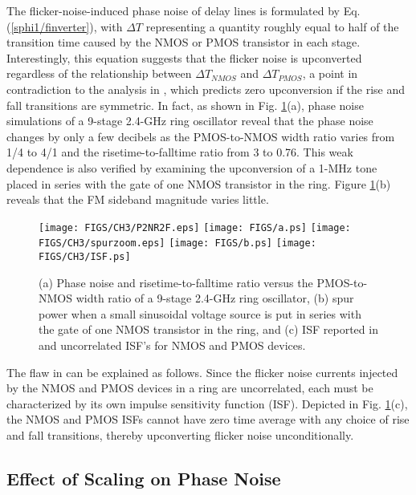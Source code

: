 The flicker-noise-induced phase noise of delay lines is formulated by Eq. (\ref{sphi1/finverter}), with $\Delta T$ representing a quantity roughly equal to half of the transition time
caused by the NMOS or PMOS transistor in each stage. Interestingly, this equation suggests that the flicker noise is upconverted regardless of the relationship between $\Delta
T_{NMOS}$ and $\Delta T_{PMOS}$, a point in contradiction to the analysis in \cite{Hajimiri}, which predicts zero upconversion if the rise and fall transitions are symmetric. In fact,
as shown in Fig. \ref{fig:P2N}(a), phase noise simulations of a 9-stage 2.4-GHz ring oscillator reveal that the phase noise changes by only a few decibels as the PMOS-to-NMOS width ratio
varies from 1/4 to 4/1 and the risetime-to-falltime ratio from 3 to 0.76. This weak dependence is also verified by examining the upconversion of a 1-MHz tone placed in series with
the gate of one NMOS transistor in the ring. Figure \ref{fig:P2N}(b) reveals that the FM sideband magnitude varies little.
\begin{figure}[htb!]
\centering
\texttt{[image: FIGS/CH3/P2NR2F.eps]}
\texttt{[image: FIGS/a.ps]}
\texttt{[image: FIGS/CH3/spurzoom.eps]}
\texttt{[image: FIGS/b.ps]}
\texttt{[image: FIGS/CH3/ISF.ps]}
\caption{(a) Phase noise and risetime-to-falltime ratio versus the PMOS-to-NMOS width ratio of a 9-stage 2.4-GHz ring oscillator, (b) spur power when a small sinusoidal voltage source is put in series with the gate of
one NMOS transistor in the ring, and (c) ISF reported in \cite{Hajimiri} and uncorrelated ISF's for NMOS and PMOS devices.}
\label{fig:P2N}
\end{figure}

The flaw in \cite{Hajimiri} can be explained as follows. Since the flicker noise currents injected by the NMOS and PMOS devices in a ring are uncorrelated, each must be characterized
by its own impulse sensitivity function (ISF). Depicted in Fig. \ref{fig:P2N}(c), the NMOS and PMOS ISFs cannot have zero time average with any choice of rise and fall transitions,
thereby upconverting flicker noise unconditionally.



\subsection{Effect of Scaling on Phase Noise}

